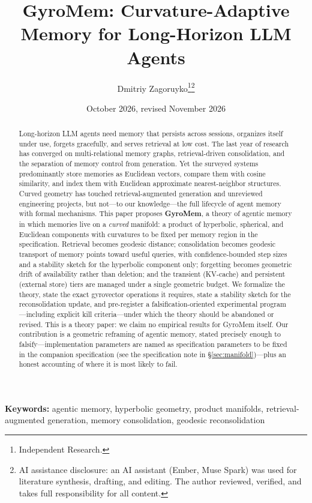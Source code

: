 \documentclass[11pt,a4paper]{article}
\title{GyroMem: Curvature-Adaptive Memory for Long-Horizon LLM Agents}
\author{Dmitriy Zagoruyko\thanks{Independent Research.}\thanks{AI assistance disclosure: an AI assistant (Ember, Muse Spark) was used for literature synthesis, drafting, and editing. The author reviewed, verified, and takes full responsibility for all content.}}
\date{October 2026, revised November 2026}
\begin{document}
\maketitle

\begin{abstract}
Long-horizon LLM agents need memory that persists across sessions, organizes
itself under use, forgets gracefully, and serves retrieval at low cost.
The last year of research has converged on multi-relational memory graphs,
retrieval-driven consolidation, and the separation of memory control from
generation. Yet the surveyed systems predominantly store memories as
Euclidean vectors, compare them with cosine similarity, and index them
with Euclidean approximate nearest-neighbor structures. Curved geometry has touched retrieval-augmented generation \cite{hyperbolicrag} and unreviewed engineering projects, but not---to our knowledge---the full lifecycle of agent memory with formal mechanisms. This paper proposes
\textbf{GyroMem}, a theory of agentic memory in which memories live on a
\emph{curved} manifold: a product of hyperbolic, spherical, and Euclidean
components with curvatures to be fixed per memory region in the specification.
Retrieval becomes geodesic distance; consolidation becomes geodesic
transport of memory points toward useful queries, with confidence-bounded
step sizes and a stability sketch for the hyperbolic component only;
forgetting becomes geometric drift of availability rather than deletion;
and the transient (KV-cache) and persistent (external store) tiers are
managed under a single geometric budget. We formalize the theory, state the
exact gyrovector operations it requires, state a stability sketch for the
reconsolidation update, and pre-register a falsification-oriented
experimental program---including explicit kill criteria---under which the
theory should be abandoned or revised. This is a theory paper: we claim no
empirical results for GyroMem itself. Our contribution is a geometric
reframing of agentic memory, stated precisely enough to falsify---implementation
parameters are named as specification parameters to be fixed in the
companion specification (see the specification note in
\S\ref{sec:manifold})---plus an honest accounting of where it is most
likely to fail.
\end{abstract}

\noindent\textbf{Keywords:} agentic memory, hyperbolic geometry, product
manifolds, retrieval-augmented generation, memory consolidation, geodesic
reconsolidation

\end{document}
